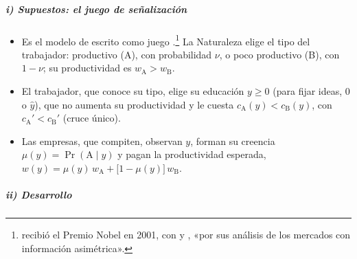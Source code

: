 \documentclass[11pt]{article}
\begin{document}
\subparagraph{i) Supuestos: el juego de señalización}

\begin{itemize}
\item Es el modelo de \textcite{Spence1973Job} escrito como juego .\footnote{ recibió el Premio Nobel en 2001, con  y , «por sus análisis de los mercados con información asimétrica»\nocite{Nobel2001AkerlofSpenceStiglitz}.} La Naturaleza elige el tipo del trabajador: productivo (A), con probabilidad $\nu$, o poco productivo (B), con $1-\nu$; su productividad es $w_{\mathrm A}>w_{\mathrm B}$.
\item El trabajador, que conoce su tipo, elige su educación $y\geq0$ (para fijar ideas, $0$ o $\hat y$), que no aumenta su productividad y le cuesta $c_{\mathrm A}(y)<c_{\mathrm B}(y)$, con $c_{\mathrm A}'<c_{\mathrm B}'$ (cruce único).
\item Las empresas, que compiten, observan $y$, forman su creencia $\mu(y)=\Pr(\mathrm A\mid y)$ y pagan la productividad esperada, $w(y)=\mu(y)\,w_{\mathrm A}+\big[1-\mu(y)\big]\,w_{\mathrm B}$.
\end{itemize}

\subparagraph{ii) Desarrollo}
\end{document}
